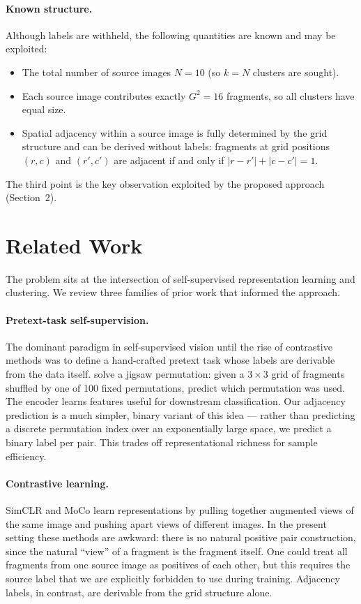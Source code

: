 \documentclass[12pt, a4paper]{article}
\begin{document}
\paragraph{Known structure.}
Although labels are withheld, the following quantities are known and may be exploited:
\begin{itemize}
    \item The total number of source images $N = 10$ (so $k = N$ clusters are sought).
    \item Each source image contributes exactly $G^2 = 16$ fragments, so all clusters
          have equal size.
    \item Spatial adjacency within a source image is fully determined by the grid
          structure and can be derived without labels: fragments at grid positions
          $(r, c)$ and $(r', c')$ are adjacent if and only if $|r - r'| + |c - c'| = 1$.
\end{itemize}

The third point is the key observation exploited by the proposed approach (Section~2).

\section{Related Work}

The problem sits at the intersection of self-supervised representation learning and
clustering. We review three families of prior work that informed the approach.

\paragraph{Pretext-task self-supervision.}
The dominant paradigm in self-supervised vision until the rise of contrastive methods
was to define a hand-crafted pretext task whose labels are derivable from the data
itself. \textcite{noroozi2016} solve a jigsaw permutation: given a $3 \times 3$ grid
of fragments shuffled by one of 100 fixed permutations, predict which permutation was
used. The encoder learns features useful for downstream classification. Our adjacency
prediction is a much simpler, binary variant of this idea --- rather than predicting
a discrete permutation index over an exponentially large space, we predict a binary
label per pair. This trades off representational richness for sample efficiency.

\paragraph{Contrastive learning.}
SimCLR \parencite{simclr2020} and MoCo \parencite{moco2020} learn representations by
pulling together augmented views of the same image and pushing apart views of
different images. In the present setting these methods are awkward: there is no
natural positive pair construction, since the natural ``view'' of a fragment is the
fragment itself. One could treat all fragments from one source image as positives
of each other, but this requires the source label that we are explicitly forbidden
to use during training. Adjacency labels, in contrast, are derivable from the grid
structure alone.
\end{document}

